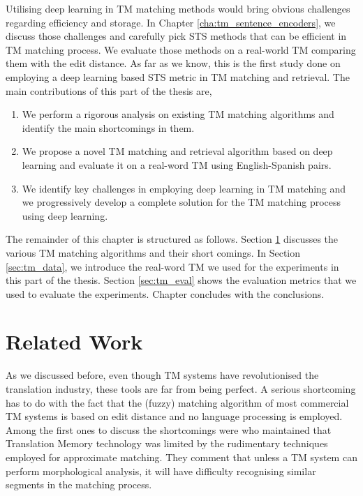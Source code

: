 Utilising deep learning in TM matching methods would bring obvious challenges regarding efficiency and storage. In Chapter \ref{cha:tm_sentence_encoders}, we discuss those challenges and carefully pick STS methods that can be efficient in TM matching process. We evaluate those methods on a real-world TM comparing them with the edit distance. As far as we know, this is the first study done on employing a deep learning based STS metric in TM matching and retrieval. The main contributions of this part of the thesis are, 

\begin{enumerate}
	\item We perform a rigorous analysis on existing TM matching algorithms and identify the main shortcomings in them.
	\item We propose a novel TM matching and retrieval algorithm based on deep learning and evaluate it on a real-word TM using English-Spanish pairs. 
	\item We identify key challenges in employing deep learning in TM matching and we progressively develop a complete solution for the TM matching process using deep learning. 
\end{enumerate}

The remainder of this chapter is structured as follows. Section \ref{sec:tm_related} discusses the various TM matching algorithms and their short comings. In Section \ref{sec:tm_data}, we introduce the real-word TM we used for the experiments in this part of the thesis. Section \ref{sec:tm_eval} shows the evaluation metrics that we used to evaluate the experiments. Chapter concludes with the conclusions. 

\section{Related Work}
\label{sec:tm_related}
As we discussed before, even though TM systems have revolutionised the translation industry, these tools are far from being perfect. A serious shortcoming has to do with the fact that the (fuzzy) matching algorithm of most commercial TM systems is based on edit distance and no language processing is employed. Among the first ones to discuss the shortcomings were \autocite{10.5555/648180.749379} who maintained that Translation Memory technology was limited by the rudimentary techniques employed for approximate matching.  They comment that unless a TM system can perform morphological analysis, it will have difficulty recognising similar segments in the matching process.

